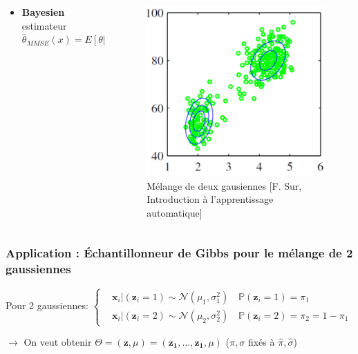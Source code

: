 \begin{frame}
\begin{columns}
\begin{column}{0.7\textwidth}
\begin{itemize}
            \item \textbf{Bayesien} estimateur $\hat{\theta}_{MMSE}(x)=E[\theta | x]$
        \end{itemize}
    \end{column}
    \begin{column}{0.3\textwidth}  %
        \vspace{-0.5cm}
        \begin{figure}
            \includegraphics[width=\textwidth]{Figures/mix_gaussienne.png}
            \caption{\tiny Mélange de deux gausiennes [F. Sur, Introduction à l'apprentissage automatique]}
        \end{figure}
    \end{column}
\end{columns}

\end{frame}

\begin{frame}
    \frametitle{Application : \'Echantillonneur de Gibbs pour le mélange de 2 gaussiennes}
    Pour 2 gaussiennes:
    $\left\{\begin{aligned}
        &\boldsymbol{x}_i |\left(\boldsymbol{z}_{i}=1\right) \sim \mathcal{N}\left(\mu_{1}, \sigma_{1}^{2}\right) \quad \mathbb{P}\left(\boldsymbol{z}_{i}=1\right)=\pi_{1}\\
        &\boldsymbol{x}_i |\left(\boldsymbol{z}_{i}=2\right) \sim \mathcal{N}\left(\mu_{2}, \sigma_{2}^{2}\right) \quad \mathbb{P}\left(\boldsymbol{z}_{i}=2\right)=\pi_{2} = 1- \pi_{1}
    \end{aligned}\right.$
        \vspace{0.4cm}
        
        $\rightarrow$ On veut obtenir $\Theta = (\boldsymbol{z}, \mu) = (\boldsymbol{z_1}, \ldots,\boldsymbol{z_1},  \mu)$ \hfill($\pi, \sigma$ fixés à $\hat{\pi}, \hat{\sigma}$)
    \end{frame}

